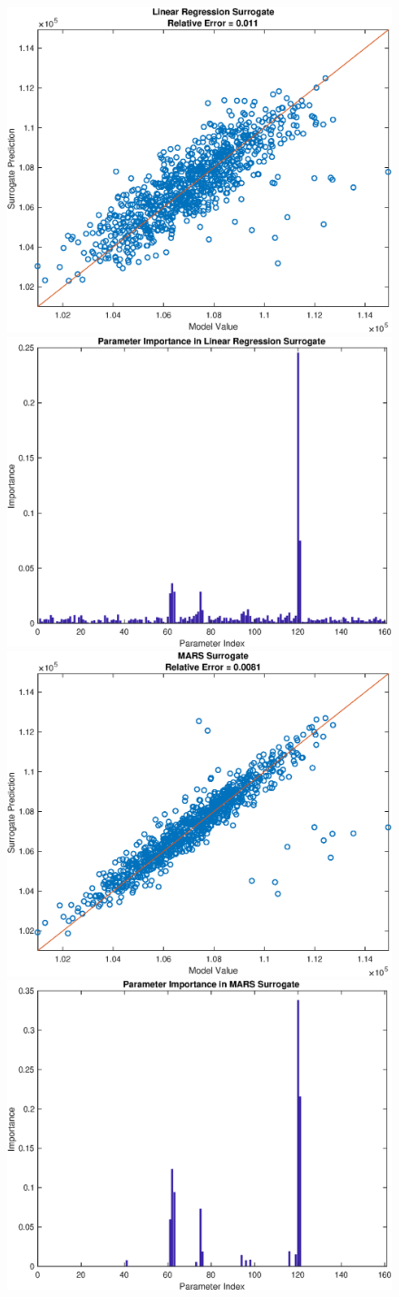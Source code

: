\documentclass[12pt]{article}
\numberwithin{equation}{section}
\begin{document}
\begin{figure}[h]
\centering
\includegraphics[width=.49 \textwidth]{Figures/K_AC_Max_QoI_LR_Prediction_Rectangular.eps}
\includegraphics[width=.49 \textwidth]{Figures/K_AC_Max_QoI_LR_VI_Rectangular.eps}\\
\includegraphics[width=.49 \textwidth]{Figures/K_AC_Max_QoI_MARS_Prediction_Rectangular.eps}
\includegraphics[width=.49 \textwidth]{Figures/K_AC_Max_QoI_MARS_VI_Rectangular.eps}
\end{figure}
\end{document}

